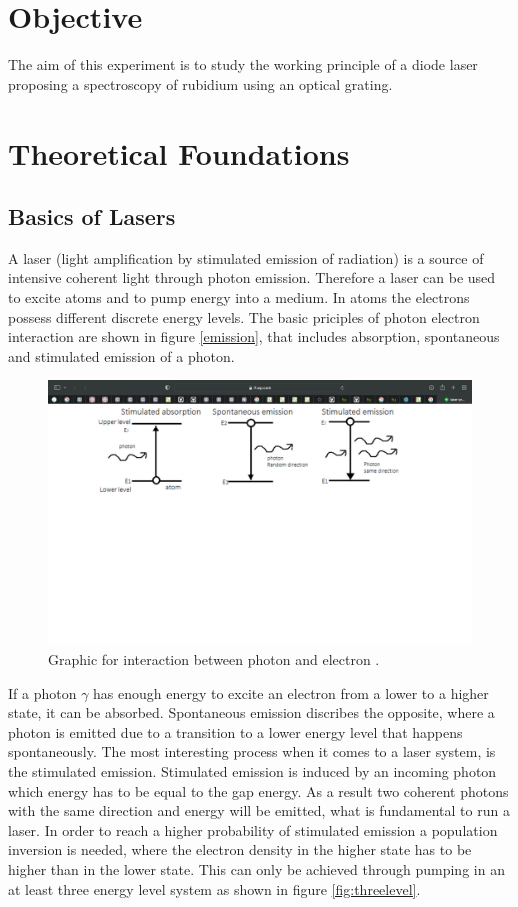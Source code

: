 \section{Objective}
The aim of this experiment is to study the working principle of a diode laser proposing a spectroscopy of rubidium using an optical grating.


\section{Theoretical Foundations}
\subsection{Basics of Lasers}

\noindent
A laser (light amplification by stimulated emission of radiation) is a source of intensive coherent light through photon emission.
Therefore a laser can be used to excite atoms and to pump energy into a medium.
In atoms the electrons possess different discrete energy levels.
The basic priciples of photon electron interaction are shown in figure \ref{emission},
that includes absorption, spontaneous and stimulated emission of a photon.


\begin{figure}
  \centering
  \includegraphics[width=\textwidth]{emission.pdf}
  \caption{Graphic for interaction between photon and electron \cite{emissiongraphic}.}
  \label{fig:emission}
\end{figure}

\noindent
If a photon $\gamma$ has enough energy to excite an electron from a lower to a higher state, it can be absorbed.
Spontaneous emission discribes the opposite, where a photon is emitted due to a transition to a lower energy level that happens spontaneously.
The  most interesting process when it comes to a laser system, is the stimulated emission.
Stimulated emission is induced by an incoming photon which energy has to be equal to the gap energy.
As a result two coherent photons with the same direction and energy will be emitted, what is fundamental to run a laser.
In order to reach a higher probability of stimulated emission a population inversion is needed, where the electron density in the higher state has to be higher than in the lower state.
This can only be achieved through pumping in an at least three energy level system as shown in figure \ref{fig:threelevel}.


